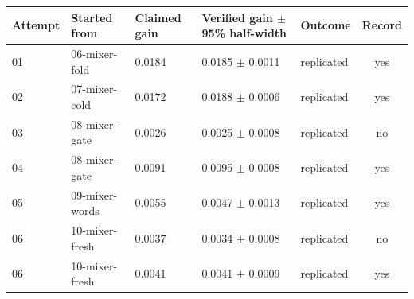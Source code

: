 \begin{tabular}{lllllc}
\toprule
Attempt & Started from & Claimed gain & Verified gain $\pm$ 95\% half-width & Outcome & Record \\
\midrule
01 & 06-mixer-fold & 0.0184 & 0.0185 $\pm$ 0.0011 & replicated & yes \\
02 & 07-mixer-cold & 0.0172 & 0.0188 $\pm$ 0.0006 & replicated & yes \\
03 & 08-mixer-gate & 0.0026 & 0.0025 $\pm$ 0.0008 & replicated & no \\
04 & 08-mixer-gate & 0.0091 & 0.0095 $\pm$ 0.0008 & replicated & yes \\
05 & 09-mixer-words & 0.0055 & 0.0047 $\pm$ 0.0013 & replicated & yes \\
06 & 10-mixer-fresh & 0.0037 & 0.0034 $\pm$ 0.0008 & replicated & no \\
06 & 10-mixer-fresh & 0.0041 & 0.0041 $\pm$ 0.0009 & replicated & yes \\
\bottomrule
\end{tabular}

